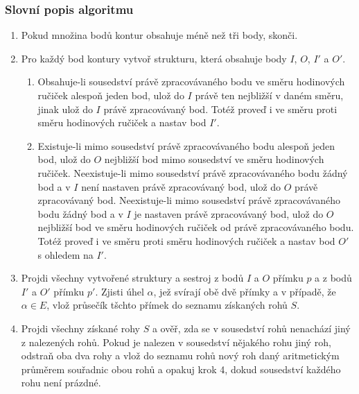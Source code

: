 \subsubsection{Slovní popis algoritmu}
\begin{enumerate}
  \item Pokud množina bodů kontur obsahuje méně než tři body, skonči.
  \item Pro každý bod kontury vytvoř strukturu, která obsahuje body $I$, $O$,
  $I'$ a $O'$.
	\begin{enumerate}
	  \item Obsahuje-li sousedství právě zpracovávaného bodu ve směru hodinových 
	  ručiček alespoň jeden bod, ulož do $I$ právě ten nejbližší v daném směru, 
	  jinak ulož do $I$ právě zpracovávaný bod. Totéž proveď i ve směru proti 
	  směru hodinových ručiček a nastav bod $I'$.
	  \item Existuje-li mimo sousedství právě zpracovávaného bodu alespoň jeden
	  bod, ulož do $O$ nejbližší bod mimo sousedství ve směru hodinových ručiček.
	  Neexistuje-li mimo sousedství právě zpracovávaného bodu žádný bod a v $I$
	  není nastaven právě zpracovávaný bod, ulož do $O$ právě zpracovávaný bod.
	  Neexistuje-li mimo sousedství právě zpracovávaného bodu žádný bod a v $I$
	  je nastaven právě zpracovávaný bod, ulož do $O$ nejbližší bod ve směru
	  hodinových ručiček od právě zpracovávaného bodu. Totéž proveď i ve směru
	  proti směru hodinových ručiček a nastav bod $O'$ s ohledem na $I'$.
	\end{enumerate}
  \item Projdi všechny vytvořené struktury a sestroj z bodů $I$ a $O$ přímku $p$
  a z bodů $I'$ a $O'$ přímku $p'$. Zjisti úhel $\alpha$, jež svírají obě dvě
  přímky a v případě, že $\alpha \in E$, vlož průsečík tšchto přímek do seznamu
  získaných rohů $S$.
  \item Projdi všechny získané rohy $S$ a ověř, zda se v sousedství rohů
  nenachází jiný z nalezených rohů. Pokud je nalezen v sousedství nějakého rohu jiný roh,
  odstraň oba dva rohy a vlož do seznamu rohů nový roh daný aritmetickým
  průměrem souřadnic obou rohů a opakuj krok 4, dokud sousedství každého rohu
  není prázdné. 
\end{enumerate}


